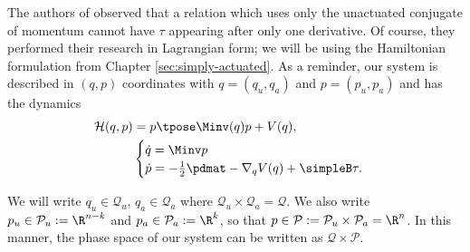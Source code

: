 The authors of
\cite{nhvc_dynamic_walking,hybrid_zero_dynamics_bipedal_nhvcs,nhvc_incline_walking}
observed that a relation which uses only the unactuated conjugate of momentum
cannot have \(\tau\) appearing after only one derivative. Of course,
they performed their research in Lagrangian form; we will be using
the Hamiltonian formulation from Chapter \ref{sec:simply-actuated}.
As a reminder, our system is described in \((q,p)\) coordinates with 
\(q = (q_u,q_a)\) and \(p = (p_u, p_a)\) and has the dynamics
\begin{align}\label{eqn:simply-actuated-hamiltonian}
    \mathcal{H}(q,p) &= p\tpose \Minv(q) p + V(q)
    , \\
    \label{eqn:simply-actuated-dynamics}
    &\begin{cases}
       \dot{q} = \Minv p \\
       \dot{p} = -\frac{1}{2} \pdmat - \nabla_q V(q) + \simpleB \tau 
       .\\
    \end{cases}
\end{align}

\begin{notation}
    We will write \(q_u \in \mathcal{Q}_u\), \(q_a \in \mathcal{Q}_a\) where
    \(\mathcal{Q}_u \times \mathcal{Q}_a = \mathcal{Q}\). 
    We also write
    \(p_u \in \mathcal{P}_u := \R^{n-k}\) and 
    \(p_a \in \mathcal{P}_a := \R^k\), so that 
    \(p \in \mathcal{P} := \mathcal{P}_u \times \mathcal{P}_a = \R^n\). 
    In this manner, the phase space of our system can be written as
    \(\mathcal{Q} \times \mathcal{P}\).
\end{notation}

